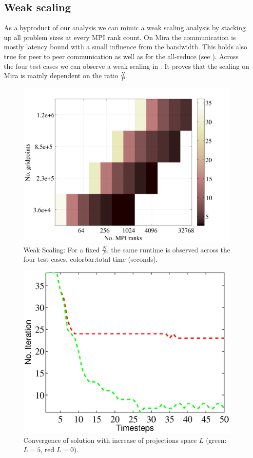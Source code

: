 \documentclass{sig-alternate}
\begin{document}
\subsection{Weak scaling}
As a byproduct of our analysis we can mimic a weak scaling analysis by stacking up 
all problem sizes at every MPI rank count. On Mira the communication is mostly 
latency bound with a small influence from the
bandwidth. This holds also true for peer to peer communication as well as for the
all-reduce (see ). Across the four test cases we can observe 
a weak scaling in . It proves that the scaling on Mira is 
mainly dependent on the ratio $\frac{N}{P}$. 
\begin{figure}
  \centering
  \includegraphics[width=\linewidth]{./figures/weak.png}
  \caption{Weak Scaling: For a fixed $\frac{N}{P}$, the same runtime is
  observed across the four test cases, colorbar:total time (seconds).}
  \label{fig:weakscaling}
\end{figure}

\begin{figure}
  \centering
  \includegraphics[width=\linewidth]{./figures/projections.eps}
  \caption{Convergence of solution with increase of projections space $L$ (green: $L=5$, red $L=0$).}
  \label{fig:projections}
\end{figure}
\end{document}
